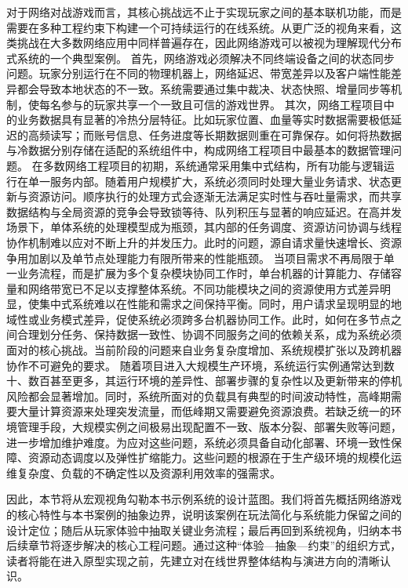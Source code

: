 对于网络对战游戏而言，其核心挑战远不止于实现玩家之间的基本联机功能，而是需要在多种工程约束下构建一个可持续运行的在线系统。从更广泛的视角来看，这类挑战在大多数网络应用中同样普遍存在，因此网络游戏可以被视为理解现代分布式系统的一个典型案例。
首先，网络游戏必须解决不同终端设备之间的状态同步问题。玩家分别运行在不同的物理机器上，网络延迟、带宽差异以及客户端性能差异都会导致本地状态的不一致。系统需要通过集中裁决、状态快照、增量同步等机制，使每名参与的玩家共享一个一致且可信的游戏世界。
其次，网络工程项目中的业务数据具有显著的冷热分层特征。比如玩家位置、血量等实时数据需要极低延迟的高频读写；而账号信息、任务进度等长期数据则重在可靠保存。如何将热数据与冷数据分别存储在适配的系统组件中，构成网络工程项目中最基本的数据管理问题。
在多数网络工程项目的初期，系统通常采用集中式结构，所有功能与逻辑运行在单一服务内部。随着用户规模扩大，系统必须同时处理大量业务请求、状态更新与资源访问。顺序执行的处理方式会逐渐无法满足实时性与吞吐量需求，而共享数据结构与全局资源的竞争会导致锁等待、队列积压与显著的响应延迟。在高并发场景下，单体系统的处理模型成为瓶颈，其内部的任务调度、资源访问协调与线程协作机制难以应对不断上升的并发压力。此时的问题，源自请求量快速增长、资源争用加剧以及单节点处理能力有限所带来的性能瓶颈。
当项目需求不再局限于单一业务流程，而是扩展为多个复杂模块协同工作时，单台机器的计算能力、存储容量和网络带宽已不足以支撑整体系统。不同功能模块之间的资源使用方式差异明显，使集中式系统难以在性能和需求之间保持平衡。同时，用户请求呈现明显的地域性或业务模式差异，促使系统必须跨多台机器协同工作。此时，如何在多节点之间合理划分任务、保持数据一致性、协调不同服务之间的依赖关系，成为系统必须面对的核心挑战。当前阶段的问题来自业务复杂度增加、系统规模扩张以及跨机器协作不可避免的要求。
随着项目进入大规模生产环境，系统运行实例通常达到数十、数百甚至更多，其运行环境的差异性、部署步骤的复杂性以及更新带来的停机风险都会显著增加。同时，系统所面对的负载具有典型的时间波动特性，高峰期需要大量计算资源来处理突发流量，而低峰期又需要避免资源浪费。若缺乏统一的环境管理手段，大规模实例之间极易出现配置不一致、版本分裂、部署失败等问题，进一步增加维护难度。为应对这些问题，系统必须具备自动化部署、环境一致性保障、资源动态调度以及弹性扩缩能力。这些问题的根源在于生产级环境的规模化运维复杂度、负载的不确定性以及资源利用效率的强需求。

因此，本节将从宏观视角勾勒本书示例系统的设计蓝图。我们将首先概括网络游戏的核心特性与本书案例的抽象边界，说明该案例在玩法简化与系统能力保留之间的设计定位；随后从玩家体验中抽取关键业务流程；最后再回到系统视角，归纳本书后续章节将逐步解决的核心工程问题。通过这种“体验—抽象—约束”的组织方式，读者将能在进入原型实现之前，先建立对在线世界整体结构与演进方向的清晰认识。


